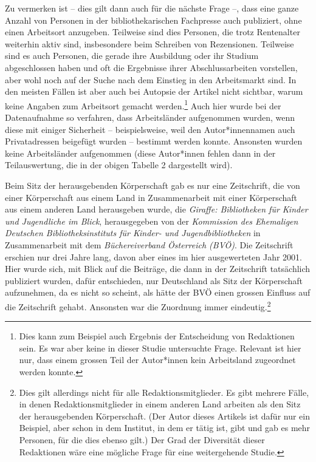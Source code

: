 \documentclass[a4paper,
fontsize=11pt,
oneside,
numbers=noperiodatend,
parskip=half-,
bibliography=totoc,
final
]{scrartcl}
\begin{document}
Zu vermerken ist -- dies gilt dann auch für die nächste Frage --, dass
eine ganze Anzahl von Personen in der bibliothekarischen Fachpresse auch
publiziert, ohne einen Arbeitsort anzugeben. Teilweise sind dies
Personen, die trotz Rentenalter weiterhin aktiv sind, insbesondere beim
Schreiben von Rezensionen. Teilweise sind es auch Personen, die gerade
ihre Ausbildung oder ihr Studium abgeschlossen haben und oft die
Ergebnisse ihrer Abschlussarbeiten vorstellen, aber wohl noch auf der
Suche nach dem Einstieg in den Arbeitsmarkt sind. In den meisten Fällen
ist aber auch bei Autopsie der Artikel nicht sichtbar, warum keine
Angaben zum Arbeitsort gemacht werden.\footnote{Dies kann zum Beispiel
  auch Ergebnis der Entscheidung von Redaktionen sein. Es war aber keine
  in dieser Studie untersuchte Frage. Relevant ist hier nur, dass einem
  grossen Teil der Autor*innen kein Arbeitsland zugeordnet werden
  konnte.} Auch hier wurde bei der Datenaufnahme so verfahren, dass
Arbeitsländer aufgenommen wurden, wenn diese mit einiger Sicherheit --
beispielsweise, weil den Autor*innennamen auch Privatadressen beigefügt
wurden -- bestimmt werden konnte. Ansonsten wurden keine Arbeitsländer
aufgenommen (diese Autor*innen fehlen dann in der Teilauswertung, die in
der obigen Tabelle 2 dargestellt wird).

Beim Sitz der herausgebenden Körperschaft gab es nur eine Zeitschrift,
die von einer Körperschaft aus einem Land in Zusammenarbeit mit einer
Körperschaft aus einem anderen Land herausgeben wurde, die
\emph{Giraffe: Bibliotheken für Kinder und Jugendliche im Blick},
herausgegeben von der \emph{Kommission des Ehemaligen Deutschen
Bibliotheksinstituts für Kinder- und Jugendbibliotheken} in
Zusammenarbeit mit dem \emph{Büchereiverband Österreich (BVÖ)}. Die
Zeitschrift erschien nur drei Jahre lang, davon aber eines im hier
ausgewerteten Jahr 2001. Hier wurde sich, mit Blick auf die Beiträge,
die dann in der Zeitschrift tatsächlich publiziert wurden, dafür
entschieden, nur Deutschland als Sitz der Körperschaft aufzunehmen, da
es nicht so scheint, als hätte der BVÖ einen grossen Einfluss auf die
Zeitschrift gehabt. Ansonsten war die Zuordnung immer
eindeutig.\footnote{Dies gilt allerdings nicht für alle
  Redaktionsmitglieder. Es gibt mehrere Fälle, in denen
  Redaktionsmitglieder in einem anderen Land arbeiten als den Sitz der
  herausgebenden Körperschaft. (Der Autor dieses Artikels ist dafür nur
  ein Beispiel, aber schon in dem Institut, in dem er tätig ist, gibt
  und gab es mehr Personen, für die dies ebenso gilt.) Der Grad der
  Diversität dieser Redaktionen wäre eine mögliche Frage für eine
  weitergehende Studie.}
\end{document}
